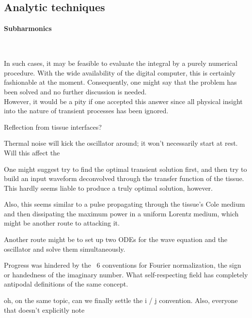 \documentclass[paper.tex]{subfiles}
\begin{document}
\subsection{Analytic techniques}


\paragraph{\textbf{Subharmonics}}\


\begin{fquote}
	In such cases, it may be feasible to evaluate the integral by a purely numerical procedure. With the wide availability of the digital computer, this is certainly fashionable at the moment. Consequently, one might say that the problem has been solved and no further discussion is needed. \\
	
	However, it would be a pity if one accepted this answer since all physical insight into the nature of transient processes has been ignored. 
\end{fquote}



\begin{autem}
Reflection from tissue interfaces?

Thermal noise will kick the oscillator around; it won't necessarily start at rest. Will this affect the 
\end{autem}

One might suggest try to find the optimal transient solution first, and then try to build an input waveform deconvolved through the  transfer function of the tissue. This hardly seems liable to produce a truly optimal solution, however.


Also, this seems similar to a pulse propagating through the tissue's Cole medium and then dissipating the maximum power in a uniform Lorentz medium, which might be another route to attacking it.

Another route might be to set up two ODEs for the wave equation and the oscillator and solve them simultaneously.

Progress was hindered by the ~6 conventions for Fourier normalization, the sign or handedness of the imaginary number. What self-respecting field has completely antipodal definitions of the same concept.

oh, on the same topic, can we finally settle the i / j convention. Also, everyone that doesn't explicitly note  
\end{document}
